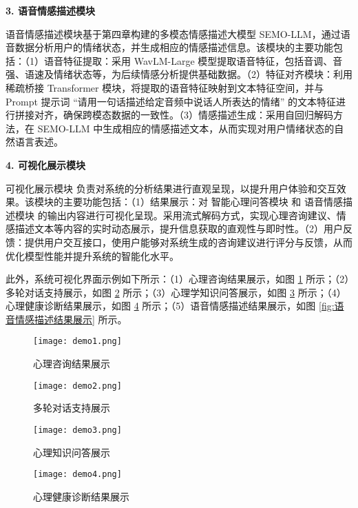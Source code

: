 \textbf{3. 语音情感描述模块}

语音情感描述模块基于第四章构建的多模态情感描述大模型 SEMO-LLM，通过语音数据分析用户的情绪状态，并生成相应的情感描述信息。该模块的主要功能包括：（1）语音特征提取：采用 WavLM-Large 模型提取语音特征，包括音调、音强、语速及情绪状态等，为后续情感分析提供基础数据。（2）特征对齐模块：利用稀疏桥接 Transformer 模块，将提取的语音特征映射到文本特征空间，并与 Prompt 提示词 “请用一句话描述给定音频中说话人所表达的情绪” 的文本特征进行拼接对齐，确保跨模态数据的一致性。（3）情感描述生成：采用自回归解码方法，在 SEMO-LLM 中生成相应的情感描述文本，从而实现对用户情绪状态的自然语言表述。

\textbf{4. 可视化展示模块}

可视化展示模块 负责对系统的分析结果进行直观呈现，以提升用户体验和交互效果。该模块的主要功能包括：（1）结果展示：对 智能心理问答模块 和 语音情感描述模块 的输出内容进行可视化呈现。采用流式解码方式，实现心理咨询建议、情感描述文本等内容的实时动态展示，提升信息获取的直观性与即时性。（2）用户反馈：提供用户交互接口，使用户能够对系统生成的咨询建议进行评分与反馈，从而优化模型性能并提升系统的智能化水平。

此外，系统可视化界面示例如下所示：（1）心理咨询结果展示，如图 \ref{fig:心理咨询结果展示} 所示；（2）多轮对话支持展示，如图 \ref{fig:多轮对话支持展示} 所示；（3）心理学知识问答展示，如图 \ref{fig:心理知识问答展示} 所示；（4）心理健康诊断结果展示，如图 \ref{fig:心理健康诊断结果展示} 所示；（5）语音情感描述结果展示，如图 \ref{fig:语音情感描述结果展示} 所示。

\begin{figure}[ht]
  \centering
  \texttt{[image: demo1.png]}
  \caption{心理咨询结果展示}
  \label{fig:心理咨询结果展示}
\end{figure}

\begin{figure}[ht]
  \centering
  \texttt{[image: demo2.png]}
  \caption{多轮对话支持展示}
  \label{fig:多轮对话支持展示}
\end{figure}

\begin{figure}[ht]
  \centering
  \texttt{[image: demo3.png]}
  \caption{心理知识问答展示}
  \label{fig:心理知识问答展示}
\end{figure}

\begin{figure}[ht]
  \centering
  \texttt{[image: demo4.png]}
  \caption{心理健康诊断结果展示}
  \label{fig:心理健康诊断结果展示}
\end{figure}

